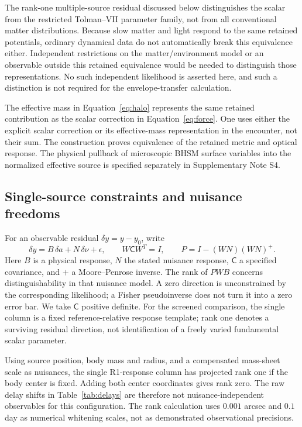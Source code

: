 The rank-one multiple-source residual discussed below distinguishes the scalar from the
restricted Tolman--VII parameter family, not from all conventional
matter distributions. Because slow matter and light respond to the same
retained potentials, ordinary dynamical data do not automatically break
this equivalence either. Independent restrictions on the matter/environment model or an observable
outside this retained equivalence would be needed to distinguish those
representations. No such independent likelihood is asserted here, and
such a distinction is not required for the envelope-transfer calculation.

The effective mass in Equation~\eqref{eq:halo} represents the same
retained contribution as the scalar correction in
Equation~\eqref{eq:force}. One uses either the explicit scalar correction
or its effective-mass representation in the encounter, not their sum.
The construction proves equivalence of the retained metric and optical
response. The physical pullback of microscopic BHSM surface variables
into the normalized effective source is specified separately in
Supplementary Note S4.

\subsection{Single-source constraints and nuisance freedoms}
For an observable residual $\delta y=y-y_0$, write
\begin{equation}
 \delta y=B\,\delta a+N\,\delta\nu+\epsilon,\qquad
 W\mathsf C W^T=I,\qquad
 P=I-(WN)(WN)^+ .
 \label{eq:nuisance}
\end{equation}
Here $B$ is a physical response, $N$ the stated nuisance response,
$\mathsf C$ a specified covariance, and $+$ a Moore--Penrose inverse.
The rank of $PWB$ concerns distinguishability in that nuisance model.
A zero direction is unconstrained by the corresponding likelihood; a
Fisher pseudoinverse does not turn it into a zero error bar.
We take $\mathsf C$ positive definite. For the screened comparison,
the single column is a fixed reference-relative response template; rank one denotes
a surviving residual direction, not identification of a freely varied
fundamental scalar parameter.

Using source position, body mass and radius, and a compensated mass-sheet
scale as nuisances, the single R1-response column has projected rank
one if the body center is fixed. Adding both center coordinates gives
rank zero. The raw delay shifts in Table~\ref{tab:delays} are therefore not
nuisance-independent observables for this configuration.
The rank calculation uses $0.001$ arcsec and $0.1$ day as numerical
whitening scales, not as demonstrated observational precisions.

